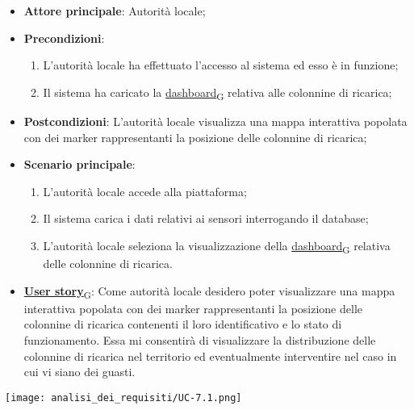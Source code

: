 \begin{itemize}
	\item \textbf{Attore principale}: Autorità locale;
	\item \textbf{Precondizioni}:
	      \begin{enumerate}
		      \item L'autorità locale ha effettuato l'accesso al sistema ed esso è in funzione;
		      \item Il sistema ha caricato la \href{https://7last.github.io/docs/rtb/documentazione-interna/glossario\#dashboard}{dashboard\textsubscript{G}} relativa alle colonnine di ricarica;
	      \end{enumerate}
	\item \textbf{Postcondizioni}: L'autorità locale visualizza una mappa interattiva popolata con dei marker rappresentanti la posizione delle colonnine di ricarica;
	\item \textbf{Scenario principale}:
	      \begin{enumerate}
		      \item L'autorità locale accede alla piattaforma;
		      \item Il sistema carica i dati relativi ai sensori interrogando il database;
		      \item L'autorità locale seleziona la visualizzazione della \href{https://7last.github.io/docs/rtb/documentazione-interna/glossario\#dashboard}{dashboard\textsubscript{G}} relativa delle colonnine di ricarica.
	      \end{enumerate}
	\item \href{https://7last.github.io/docs/rtb/documentazione-interna/glossario\#user-story}{\textbf{User story}\textsubscript{G}}:
	      Come autorità locale desidero poter visualizzare una mappa interattiva popolata con dei marker rappresentanti la posizione delle colonnine di ricarica
	      contenenti il loro identificativo e lo stato di funzionamento. Essa mi consentirà di visualizzare la distribuzione delle colonnine di ricarica nel territorio
	      ed eventualmente interventire nel caso in cui vi siano dei guasti.
\end{itemize}
\begin{center}
	\texttt{[image: analisi\_dei\_requisiti/UC-7.1.png]}
\end{center}

